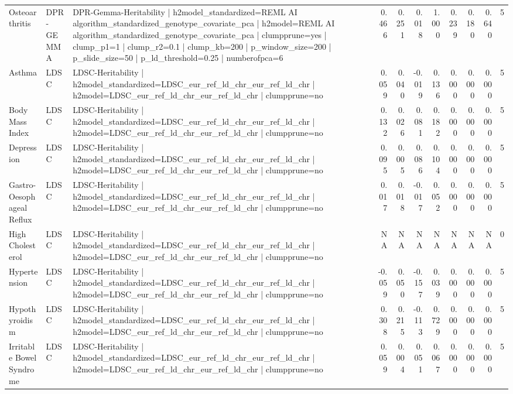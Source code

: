 \begin{landscape}
\begin{longtable}{p{2.4cm}p{1.8cm}p{6.0cm}rrrrrrrr}
Osteoarthritis & DPR-GEMMA & DPR-Gemma-Heritability | h2model\_standardized=REML AI algorithm\_standardized\_genotype\_covariate\_pca | h2model=REML AI algorithm\_standardized\_genotype\_covariate\_pca | clumpprune=yes | clump\_p1=1 | clump\_r2=0.1 | clump\_kb=200 | p\_window\_size=200 | p\_slide\_size=50 | p\_ld\_threshold=0.25 | numberofpca=6 & 0.466 & 0.251 & 0.018 & 1.000 & 0.239 & 0.180 & 0.640 & 5 \\
Asthma & LDSC & LDSC-Heritability | h2model\_standardized=LDSC\_eur\_ref\_ld\_chr\_eur\_ref\_ld\_chr | h2model=LDSC\_eur\_ref\_ld\_chr\_eur\_ref\_ld\_chr | clumpprune=no & 0.059 & 0.040 & -0.019 & 0.136 & 0.000 & 0.000 & 0.000 & 5 \\
Body Mass Index & LDSC & LDSC-Heritability | h2model\_standardized=LDSC\_eur\_ref\_ld\_chr\_eur\_ref\_ld\_chr | h2model=LDSC\_eur\_ref\_ld\_chr\_eur\_ref\_ld\_chr | clumpprune=no & 0.132 & 0.026 & 0.081 & 0.182 & 0.000 & 0.000 & 0.000 & 5 \\
Depression & LDSC & LDSC-Heritability | h2model\_standardized=LDSC\_eur\_ref\_ld\_chr\_eur\_ref\_ld\_chr | h2model=LDSC\_eur\_ref\_ld\_chr\_eur\_ref\_ld\_chr | clumpprune=no & 0.095 & 0.005 & 0.086 & 0.104 & 0.000 & 0.000 & 0.000 & 5 \\
Gastro-Oesophageal Reflux & LDSC & LDSC-Heritability | h2model\_standardized=LDSC\_eur\_ref\_ld\_chr\_eur\_ref\_ld\_chr | h2model=LDSC\_eur\_ref\_ld\_chr\_eur\_ref\_ld\_chr | clumpprune=no & 0.017 & 0.018 & -0.017 & 0.052 & 0.000 & 0.000 & 0.000 & 5 \\
High Cholesterol & LDSC & LDSC-Heritability | h2model\_standardized=LDSC\_eur\_ref\_ld\_chr\_eur\_ref\_ld\_chr | h2model=LDSC\_eur\_ref\_ld\_chr\_eur\_ref\_ld\_chr | clumpprune=no & NA & NA & NA & NA & NA & NA & NA & 0 \\
Hypertension & LDSC & LDSC-Heritability | h2model\_standardized=LDSC\_eur\_ref\_ld\_chr\_eur\_ref\_ld\_chr | h2model=LDSC\_eur\_ref\_ld\_chr\_eur\_ref\_ld\_chr | clumpprune=no & -0.059 & 0.050 & -0.157 & 0.039 & 0.000 & 0.000 & 0.000 & 5 \\
Hypothyroidism & LDSC & LDSC-Heritability | h2model\_standardized=LDSC\_eur\_ref\_ld\_chr\_eur\_ref\_ld\_chr | h2model=LDSC\_eur\_ref\_ld\_chr\_eur\_ref\_ld\_chr | clumpprune=no & 0.308 & 0.215 & -0.113 & 0.729 & 0.000 & 0.000 & 0.000 & 5 \\
Irritable Bowel Syndrome & LDSC & LDSC-Heritability | h2model\_standardized=LDSC\_eur\_ref\_ld\_chr\_eur\_ref\_ld\_chr | h2model=LDSC\_eur\_ref\_ld\_chr\_eur\_ref\_ld\_chr | clumpprune=no & 0.059 & 0.004 & 0.051 & 0.067 & 0.000 & 0.000 & 0.000 & 5 \\

\end{longtable}
\end{landscape}
